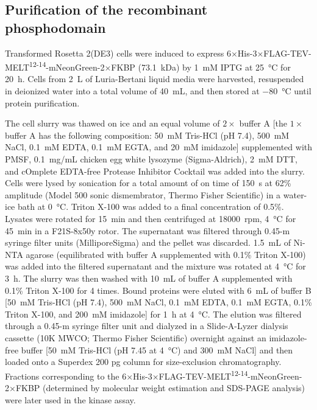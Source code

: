\subsection{Purification of the recombinant  phosphodomain}
\label{M3Purification}
Transformed Rosetta\texttrademark{} 2(DE3) cells were induced to express 6×His-3×FLAG-TEV-MELT\textsuperscript{12-14}-mNeonGreen-2×FKBP (\SI{73.1}{kDa}) by \SI{1}{mM} IPTG at \SI{25}{\celsius} for \SI{20}{h}. Cells from \SI{2}{L} of Luria-Bertani liquid media were harvested, resuspended in deionized water into a total volume of \SI{40}{mL}, and then stored at \SI{-80}{\celsius} until protein purification.

The cell slurry was thawed on ice and an equal volume of $2\times$ buffer A [the $1\times$ buffer A has the following composition: \SI{50}{mM} Tris-HCl (pH 7.4), \SI{500}{mM} NaCl, \SI{0.1}{mM} EDTA, \SI{0.1}{mM} EGTA, and \SI{20}{mM} imidazole] supplemented with PMSF, \SI{0.1}{mg/mL} chicken egg white lysozyme (Sigma-Aldrich), \SI{2}{mM} DTT, and cOmplete\texttrademark{} EDTA-free Protease Inhibitor Cocktail was added into the slurry. Cells were lysed by sonication for a total amount of on time of \SI{150}{s} at 62\% amplitude (Model 500 sonic dismembrator, Thermo Fisher Scientific) in a water-ice bath at \SI{0}{\celsius}. Triton X-100 was added to a final concentration of 0.5\%. Lysates were rotated for \SI{15}{min} and then centrifuged at \SI{18000}{rpm}, \SI{4}{\celsius} for \SI{45}{min} in a F21S-8x50y rotor. The supernatant was filtered through 0.45-\textmu{}m syringe filter units (MilliporeSigma) and the pellet was discarded. \SI{1.5}{mL} of Ni-NTA agarose (equilibrated with buffer A supplemented with 0.1\% Triton X-100) was added into the filtered supernatant and the mixture was rotated at \SI{4}{\celsius} for \SI{3}{h}. The slurry was then washed with \SI{10}{mL} of buffer A supplemented with 0.1\% Triton X-100 for 4 times. Bound proteins were eluted with \SI{6}{mL} of buffer B [\SI{50}{mM} Tris-HCl (pH 7.4), \SI{500}{mM} NaCl, \SI{0.1}{mM} EDTA, \SI{0.1}{mM} EGTA, 0.1\% Triton X-100, and \SI{200}{mM} imidazole] for \SI{1}{h} at \SI{4}{\celsius}. The elution was filtered through a 0.45-\textmu{}m syringe filter unit and dialyzed in a Slide-A-Lyzer\texttrademark{} dialysis cassette (10K MWCO; Thermo Fisher Scientific) overnight against an imidazole-free buffer [\SI{50}{mM} Tris-HCl (pH 7.45 at \SI{4}{\celsius}) and \SI{300}{mM} NaCl] and then loaded onto a Superdex 200 pg column for size-exclusion chromatography. Fractions corresponding to the 6×His-3×FLAG-TEV-MELT\textsuperscript{12-14}-mNeonGreen-2×FKBP (determined by molecular weight estimation and SDS-PAGE analysis) were later used in the  kinase assay.

